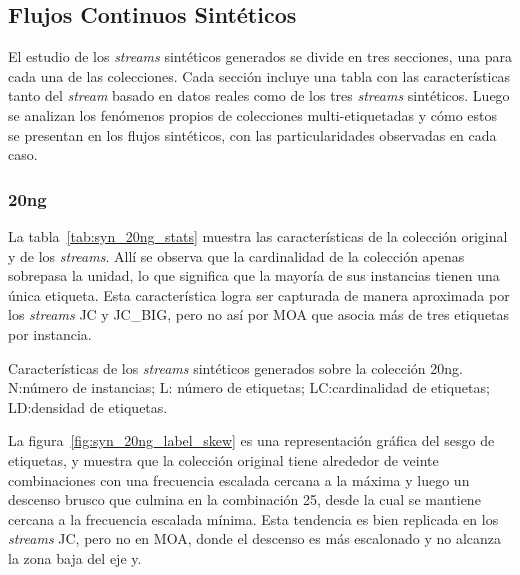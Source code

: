 \subsection{Flujos Continuos Sintéticos}
\label{experimentos_syn_streams}

El estudio de los \textit{streams} sintéticos generados se divide en tres
secciones, una para cada una de las colecciones. Cada sección incluye
una tabla con las características tanto del \textit{stream} basado en datos
reales como de los tres \textit{streams} sintéticos. Luego se analizan los
fenómenos propios de colecciones multi-etiquetadas y cómo estos se presentan en
los flujos sintéticos, con las particularidades observadas en cada caso.

\subsubsection{20ng}

La tabla~\ref{tab:syn_20ng_stats} muestra las características de la colección
original y de los \textit{streams}. Allí se observa que la cardinalidad de la
colección apenas sobrepasa la unidad, lo que significa que la mayoría de sus
instancias tienen una única etiqueta. Esta característica logra ser capturada de
manera aproximada por los \textit{streams} JC y JC\_BIG, pero no así por MOA que
asocia más de tres etiquetas por instancia.

\begin{table}[htbp]
	\centering
	\begin{adjustbox}{max width=\textwidth}
		
	\end{adjustbox}
	\caption[Características de los \textit{streams} sintéticos generados sobre
		la colección 20ng.]{Características de los \textit{streams} sintéticos
		generados sobre la colección 20ng.  N:\@ número de instancias; L:\@
		número de etiquetas; LC:\@ cardinalidad de etiquetas; LD:\@ densidad de
		etiquetas.}
	\label{tab:syn_20ng_stats}
\end{table}


La figura~\ref{fig:syn_20ng_label_skew} es una representación gráfica del sesgo
de etiquetas, y muestra que la colección original tiene alrededor de veinte
combinaciones con una frecuencia escalada cercana a la máxima y luego un
descenso brusco que culmina en la combinación 25, desde la cual se mantiene
cercana a la frecuencia escalada mínima. Esta tendencia es bien replicada en los
\textit{streams} JC, pero no en MOA, donde el descenso es más escalonado y no
alcanza la zona baja del eje y.

